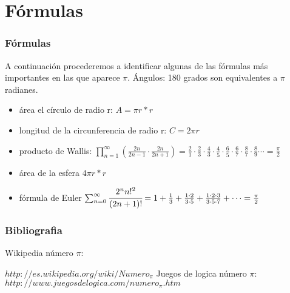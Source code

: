 \documentclass{beamer}
\begin{document}
\section {Fórmulas}
\begin{frame}
\frametitle{Fórmulas}
\begin{block}
A continuación procederemos a identificar algunas de las fórmulas más importantes en las que aparece $\pi$.
%
%
%
Ángulos: 180 grados son equivalentes a $\pi$ radianes.
%
%
\begin{itemize}
\item área el círculo de radio  r: $ A= \pi r*r $\pause
\item longitud de la circunferencia de radio r: $ C= 2 \pi r $ \pause
\item producto de Wallis: $ \prod_{n=1}^{\infty} \left(\frac{2n}{2n-1}\cdot\frac{2n}{2n+1}\right) = \frac{2}{1} \cdot \frac{2}{3} \cdot \frac{4}{3} \cdot \frac{4}{5} \cdot \frac{6}{5} \cdot \frac{6}{7} \cdot \frac{8}{7} \cdot \frac{8}{9} \cdots = \frac{\pi}{2} $ \pause
\item área de la esfera $ 4 \pi r*r $ \pause
\item fórmula de Euler $\sum_{n=0}^{\infty }\cfrac{2^n n!^2}{(2n + 1)!}=1 + \frac{1}{3} + \frac{1 \cdot 2}{3 \cdot 5} + \frac{1 \cdot 2 \cdot 3}{3 \cdot 5 \cdot 7} + \cdots = \frac{\pi}{2}$
%
\end{itemize}
%
\end{block}
\end{frame}

\begin{frame}
\frametitle{Bibliografia}
\begin{thebibliography}{10}
\beamertemplatebookbibitems
{}
Wikipedia número $\pi$:

{\small $ http://es.wikipedia.org/wiki/Numero_\pi $}
Juegos de logica número $\pi$:
{\small $ http://www.juegosdelogica.com/numero_\pi.htm $ }
\end{thebibliography}
\end{frame}
\end{document}
